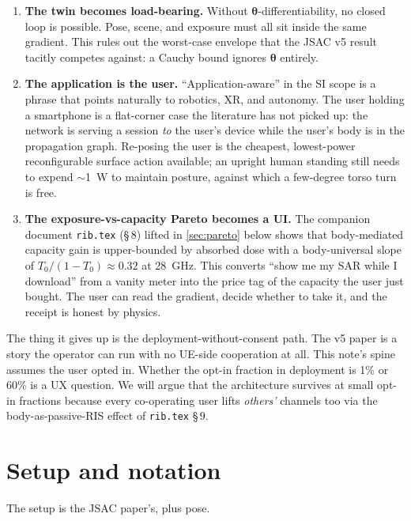 \documentclass[11pt,a4paper]{article}
\theoremstyle{definition}
\newcommand{\thetab}{\bm{\theta}}
\begin{document}
\begin{enumerate}[leftmargin=1.6em,itemsep=3pt]
\item \textbf{The twin becomes load-bearing.}  Without
$\thetab$-differentiability, no closed loop is possible.  Pose, scene,
and exposure must all sit inside the same gradient.  This rules out
the worst-case envelope that the JSAC v5 result tacitly competes
against: a Cauchy bound ignores $\thetab$ entirely.
\item \textbf{The application is the user.}  ``Application-aware''
in the SI scope is a phrase that points naturally to robotics, XR,
and autonomy.  The user holding a smartphone is a flat-corner case
the literature has not picked up: the network is serving a session
\emph{to} the user's device while the user's body is in the
propagation graph.  Re-posing the user is the cheapest, lowest-power
reconfigurable surface action available; an upright human standing
still needs to expend $\sim$\SI{1}{W} to maintain posture, against
which a few-degree torso turn is free.
\item \textbf{The exposure-vs-capacity Pareto becomes a UI.}
The companion document \texttt{rib.tex} (\S\,8) lifted in
\cref{sec:pareto} below shows that body-mediated capacity gain is
upper-bounded by
absorbed dose with a body-universal slope of $T_0/(1-T_0)\approx
0.32$ at \SI{28}{GHz}.  This converts ``show me my SAR while I
download'' from a vanity meter into the price tag of the capacity
the user just bought.  The user can read the gradient, decide
whether to take it, and the receipt is honest by physics.
\end{enumerate}

The thing it gives up is the deployment-without-consent path.  The
v5 paper is a story the operator can run with no UE-side cooperation
at all.  This note's spine assumes the user opted in.  Whether the
opt-in fraction in deployment is 1\% or 60\% is a UX question.  We
will argue that the architecture survives at small opt-in fractions
because every co-operating user lifts \emph{others'} channels too via
the body-as-passive-RIS effect of \texttt{rib.tex} \S\,9.

\section{Setup and notation}\label{sec:setup}

The setup is the JSAC paper's, plus pose.
\end{document}

